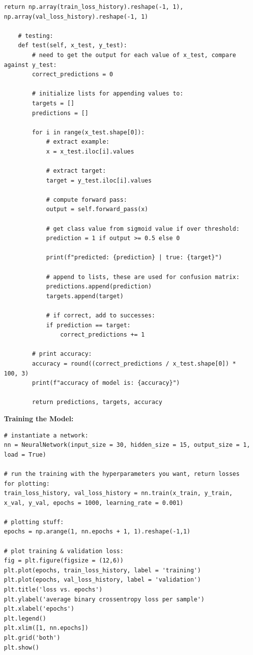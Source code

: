 \documentclass[a4paper]{article}
\begin{document}
\begin{lstlisting}[basicstyle= \scriptsize]
        return np.array(train_loss_history).reshape(-1, 1), np.array(val_loss_history).reshape(-1, 1)

    # testing:
    def test(self, x_test, y_test):
        # need to get the output for each value of x_test, compare against y_test:
        correct_predictions = 0

        # initialize lists for appending values to:
        targets = []
        predictions = []

        for i in range(x_test.shape[0]):
            # extract example:
            x = x_test.iloc[i].values

            # extract target:
            target = y_test.iloc[i].values

            # compute forward pass:
            output = self.forward_pass(x)

            # get class value from sigmoid value if over threshold:
            prediction = 1 if output >= 0.5 else 0

            print(f"predicted: {prediction} | true: {target}")

            # append to lists, these are used for confusion matrix:
            predictions.append(prediction)
            targets.append(target)

            # if correct, add to successes:
            if prediction == target:
                correct_predictions += 1

        # print accuracy:
        accuracy = round((correct_predictions / x_test.shape[0]) * 100, 3)
        print(f"accuracy of model is: {accuracy}")

        return predictions, targets, accuracy   
\end{lstlisting}

\textbf{Training the Model:}

\begin{lstlisting}[basicstyle= \scriptsize]
# instantiate a network:
nn = NeuralNetwork(input_size = 30, hidden_size = 15, output_size = 1, load = True)

# run the training with the hyperparameters you want, return losses for plotting:
train_loss_history, val_loss_history = nn.train(x_train, y_train, x_val, y_val, epochs = 1000, learning_rate = 0.001)

# plotting stuff:
epochs = np.arange(1, nn.epochs + 1, 1).reshape(-1,1)

# plot training & validation loss:
fig = plt.figure(figsize = (12,6))
plt.plot(epochs, train_loss_history, label = 'training')
plt.plot(epochs, val_loss_history, label = 'validation')
plt.title('loss vs. epochs')
plt.ylabel('average binary crossentropy loss per sample')
plt.xlabel('epochs')
plt.legend()
plt.xlim([1, nn.epochs])
plt.grid('both')
plt.show()
\end{lstlisting}
\end{document}
